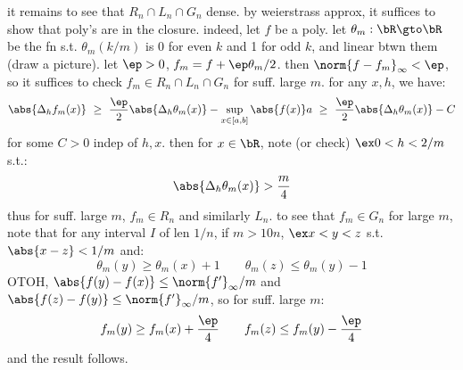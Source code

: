 it remains to see that $R_{n}\cap L_{n}\cap G_{n}$ dense.
by weierstrass approx, it suffices to show that poly's are in the closure.
indeed, let $f$ be a poly.
let $\theta_{m}:\bR\gto\bR$ be the fn s.t. $\theta_{m}(k/m)$ is 0 for even $k$ and 1 for odd $k$,
and linear btwn them (draw a picture).
let $\ep>0$, $f_{m}=f+\ep\theta_{m}/2$.
then $\norm{f-f_{m}}_{\infty}<\ep$, so it suffices to check $f_{m}\in R_{n}\cap L_{n}\cap G_{n}$
for suff. large $m$. for any $x,h$, we have:
\begin{equation*}
	\abs{\Delta_{h}f_{m}(x)}
	\ \geq \ \frac{\ep}{2}\abs{\Delta_{h}\theta_{m}(x)} - \sup_{x\in[a,b]}\abs{f(x)}a
	\ \geq \ \frac{\ep}{2}\abs{\Delta_{h}\theta_{m}(x)}-C
\end{equation*}
for some $C>0$ indep of $h,x$.
then for $x\in\bR$, note (or check) $\ex0<h<2/m$ s.t.:
\begin{equation*}
	\abs{\Delta_{h}\theta_{m}(x)}>\frac{m}{4}
\end{equation*}
thus for suff. large $m$, $f_{m}\in R_{n}$ and similarly $L_{n}$.
to see that $f_{m}\in G_{n}$ for large $m$, note that for any interval $I$ of len $1/n$,
if $m>10n$, $\ex x<y<z$ s.t. $\abs{x-z}<1/m$ and:
\begin{equation*}
	\theta_{m}(y)\geq\theta_{m}(x)+1 \qquad \theta_{m}(z)\leq\theta_{m}(y)-1
\end{equation*}
OTOH, $\abs{f(y)-f(x)}\leq\norm{f'}_{\infty}/m$ and $\abs{f(z)-f(y)}\leq\norm{f'}_{\infty}/m$,
so for suff. large $m$:
\begin{equation*}
	f_{m}(y)\geq f_{m}(x)+\frac{\ep}{4} \qquad f_{m}(z)\leq f_{m}(y)-\frac{\ep}{4}
\end{equation*}
and the result follows.
